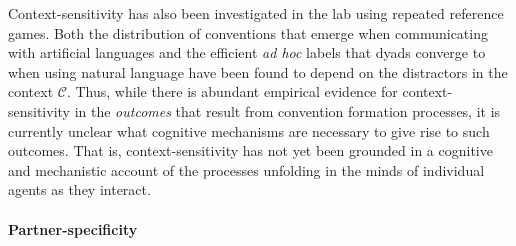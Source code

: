 Context-sensitivity has also been investigated in the lab using repeated reference games.
Both the distribution of conventions that emerge when communicating with artificial languages \cite{WintersKirbySmith14_LanguagesAdapt, KirbyTamarizCornishSmith15_CompressionCommunication} and the efficient \emph{ad hoc} labels that dyads converge to when using natural language \cite{hawkins2020characterizing} have been found to depend on the distractors in the context $\mathcal{C}$.
Thus, while there is abundant empirical evidence for context-sensitivity in the \emph{outcomes} that result from convention formation processes, it is currently unclear what cognitive mechanisms are necessary to give rise to such outcomes.
That is, context-sensitivity has not yet been grounded in a cognitive and mechanistic account of the processes unfolding in the minds of individual agents as they interact.

\paragraph{Partner-specificity}

